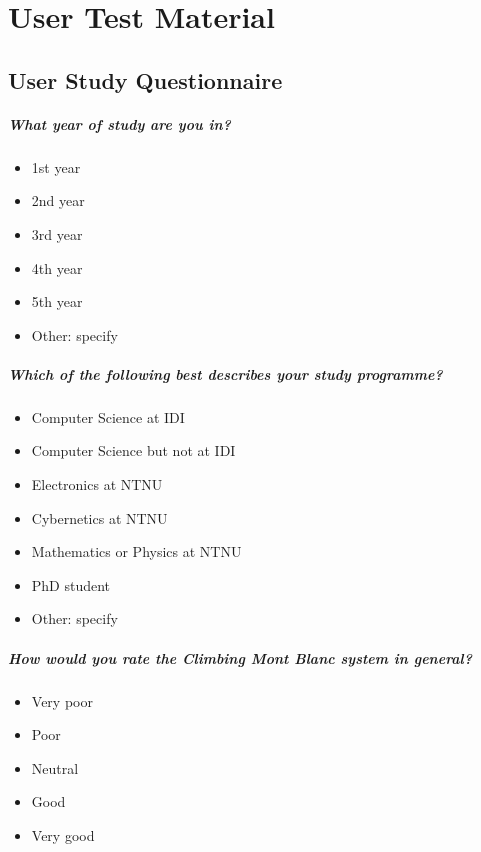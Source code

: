 \chapter{User Test Material}
\label{apdx:usertest}

\section{User Study Questionnaire}
\paragraph*{What year of study are you in?} \hfill
\begin{itemize}
\item 1st year
\item 2nd year
\item 3rd year
\item 4th year
\item 5th year
\item Other: specify
\end{itemize}

\paragraph*{Which of the following best describes your study programme?} \hfill
\begin{itemize}
\item Computer Science at IDI
\item Computer Science but not at IDI
\item Electronics at NTNU
\item Cybernetics at NTNU
\item Mathematics or Physics at NTNU
\item PhD student
\item Other: specify
\end{itemize}

\paragraph*{How would you rate the Climbing Mont Blanc system in general?} \hfill
\begin{itemize}
  \item Very poor
  \item Poor
  \item Neutral
  \item Good
  \item Very good
\end{itemize}

